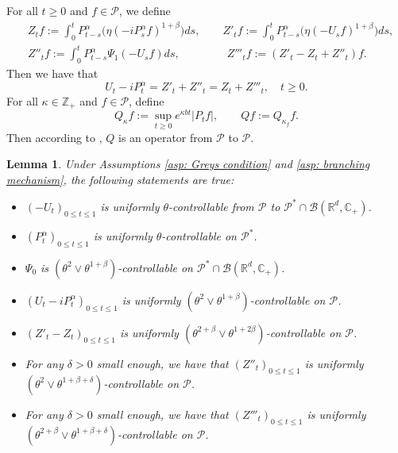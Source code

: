 \documentclass[12pt,a4paper]{amsart}
\theoremstyle{plain}
\newtheorem{lem}[thm]{Lemma}
\theoremstyle{definition}
\numberwithin{equation}{section}
\begin{document}
       For all $t\geq 0$ and $f\in \mathcal P$, we define
\begin{align}\label{eq: def of Zf}
   & Z_t f
    := \int_0^t P^\alpha_{t-s}\big( \eta (-i P^\alpha_sf)^{1+\beta}\big)ds,
\qquad Z'_t f
    := \int_0^t P^\alpha_{t-s}\big( \eta (-U_s f)^{1+\beta}\big)ds,\\
 &  Z''_t f
    := \int_0^t P^\alpha_{t-s}\Psi_1(-U_s f)ds,
\qquad \qquad\  Z'''_t f
    := (Z'_t - Z_t+ Z''_t)f.
\end{align}
    Then we have that
\begin{equation}
\label{eq: key equality}
    U_t - i P^\alpha_t
    = Z'_t + Z''_t
    = Z_t+Z'''_t, \quad t\geq 0.
\end{equation}
	For all $\kappa \in \mathbb Z_+$ and $f\in \mathcal P$, define
\begin{equation}\label{Q_k}
    Q_\kappa f
    := \sup_{t\geq 0} e^{\kappa b t}|P_t f|, \qquad  Q f:= Q_{\kappa_f}f.
\end{equation}
    Then according to \cite[Fact 1.2]{MarksMilos2018CLT}, $Q$ is an operator from $\mathcal P$ to $\mathcal P$.


\begin{lem}
\label{lem: upper bound for usgx}
        Under Assumptions \ref{asp: Greys condition} and \ref{asp: branching mechanism}, the following statements are true:
\begin{itemize}
\item[(1)]
    $(-U_t)_{0\leq t\leq 1}$ is uniformly $\theta$-controllable from $\mathcal P$ to $\mathcal P^*\cap \mathcal B(\mathbb R^d, \mathbb C_+)$.
\item[(2)]
    $(P^\alpha_t)_{0\leq t\leq 1}$ is uniformly $\theta$-controllable on $\mathcal P^*$.
\item[(3)]
       $\Psi_0$ is $(\theta^2\vee \theta^{1+\beta})$-controllable on $\mathcal P^* \cap \mathcal B(\mathbb R^d, \mathbb C_+)$.
\item[(4)]
    $(U_t- iP_t^{\alpha})_{0\leq t\leq 1}$ is uniformly $(\theta^2\vee \theta^{1+\beta})$-controllable on $\mathcal P$.
\item[(5)]
        $(Z'_t-Z_t)_{0\leq t\leq 1}$ is uniformly $(\theta^{2+\beta}\vee \theta^{1+2\beta})$-controllable on $\mathcal P$.
\item[(6)]
        For any $\delta > 0$ small enough, we have that $(Z''_t)_{0\leq t\leq 1}$ is uniformly $(\theta^2\vee \theta^{1+\beta+\delta})$-controllable on $\mathcal P$.
\item[(7)]
       For any $\delta > 0$ small enough, we have that $(Z'''_t)_{0\leq t\leq 1}$ is uniformly $(\theta^{2+\beta}\vee \theta^{1+\beta+\delta})$-controllable on $\mathcal P$.
\end{itemize}
\end{lem}
\end{document}

